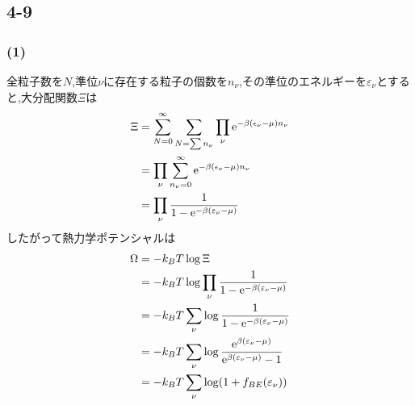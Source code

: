 \subsection*{4-9}
\subsubsection*{(1)}
全粒子数を$N$,準位$\nu$に存在する粒子の個数を$n_\nu$,その準位のエネルギーを$\varepsilon_\nu$とすると,大分配関数$\Xi$は
\begin{align}
  \begin{split}
    \Xi&=\sum_{N=0}^{\infty}\sum_{N=\sum n_\nu}\prod_\nu {\rm e}^{-\beta(\epsilon_\nu-\mu)n_\nu}\\
    &=\prod_\nu\sum_{n_\nu=0}^{\infty} {\rm e}^{-\beta(\epsilon_\nu-\mu)n_\nu}\\
    &=\prod_\nu\frac{1}{1-{\rm e}^{-\beta(\varepsilon_\nu-\mu)}}\\
  \end{split}
\end{align}
したがって熱力学ポテンシャルは
\begin{align}
  \begin{split}
    \Omega&=-k_BT\log\Xi\\
    &=-k_BT\log\prod_\nu\frac{1}{1-{\rm e}^{-\beta(\varepsilon_\nu-\mu)}}\\
    &=-k_BT\sum_\nu\log\frac{1}{1-{\rm e}^{-\beta(\varepsilon_\nu-\mu)}}\\
    &=-k_BT\sum_\nu\log\frac{{\rm e}^{\beta(\varepsilon_\nu-\mu)}}{{\rm e}^{\beta(\varepsilon_\nu-\mu)}-1}\\
    &=-k_BT\sum_\nu\log(1+f_{BE}(\varepsilon_\nu))
  \end{split}
\end{align}
